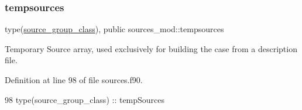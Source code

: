 \subsubsection{\texorpdfstring{tempsources}{tempsources}}
{\footnotesize\ttfamily type(\mbox{\hyperlink{structsources__mod_1_1source__group__class}{source\+\_\+group\+\_\+class}}), public sources\+\_\+mod\+::tempsources}



Temporary Source array, used exclusively for building the case from a description file. 



Definition at line 98 of file sources.\+f90.


\begin{DoxyCode}
98     \textcolor{keywordtype}{type}(source\_group\_class) :: tempSources
\end{DoxyCode}
